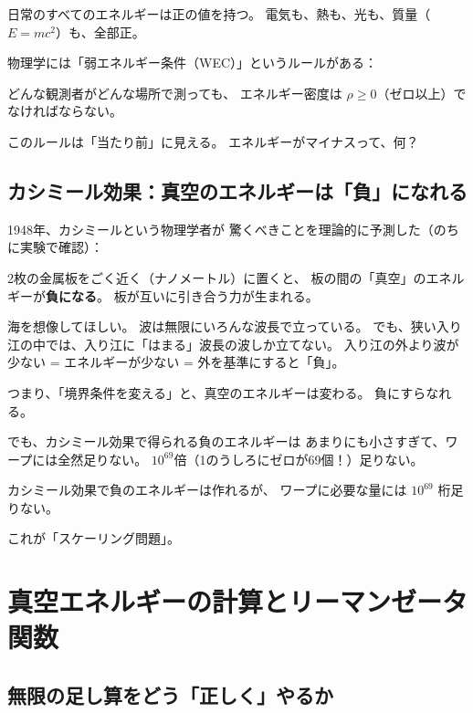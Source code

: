 \documentclass[12pt,a4paper]{article}
\begin{document}
日常のすべてのエネルギーは正の値を持つ。
電気も、熱も、光も、質量（$E=mc^2$）も、全部正。

物理学には「弱エネルギー条件（WEC）」というルールがある：

\begin{keybox}
どんな観測者がどんな場所で測っても、
エネルギー密度は $\rho \geq 0$（ゼロ以上）でなければならない。
\end{keybox}

このルールは「当たり前」に見える。
エネルギーがマイナスって、何？

\subsection{カシミール効果：真空のエネルギーは「負」になれる}

1948年、カシミールという物理学者が
驚くべきことを理論的に予測した（のちに実験で確認）：

2枚の金属板をごく近く（ナノメートル）に置くと、
板の間の「真空」のエネルギーが\textbf{負になる}。
板が互いに引き合う力が生まれる。

\begin{analogybox}
海を想像してほしい。
波は無限にいろんな波長で立っている。
でも、狭い入り江の中では、入り江に「はまる」波長の波しか立てない。
入り江の外より波が少ない = エネルギーが少ない = 外を基準にすると「負」。
\end{analogybox}

つまり、「境界条件を変える」と、真空のエネルギーは変わる。
負にすらなれる。

でも、カシミール効果で得られる負のエネルギーは
あまりにも小さすぎて、ワープには全然足りない。
$10^{69}$倍（1のうしろにゼロが69個！）足りない。

\begin{problembox}
カシミール効果で負のエネルギーは作れるが、
ワープに必要な量には $10^{69}$ 桁足りない。

これが「スケーリング問題」。
\end{problembox}

\section{真空エネルギーの計算とリーマンゼータ関数}

\subsection{無限の足し算をどう「正しく」やるか}
\end{document}
